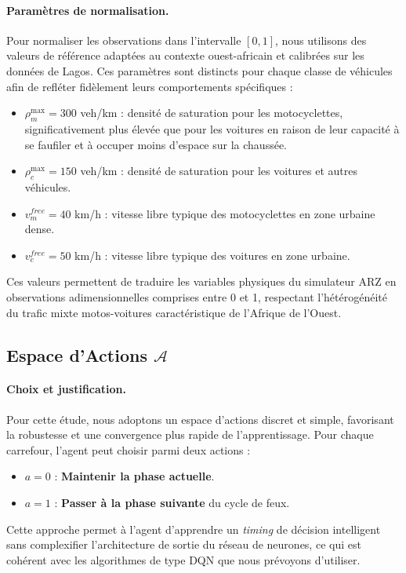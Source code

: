 \paragraph{Paramètres de normalisation.}
Pour normaliser les observations dans l'intervalle $[0, 1]$, nous utilisons des valeurs de référence adaptées au contexte ouest-africain et calibrées sur les données de Lagos. Ces paramètres sont distincts pour chaque classe de véhicules afin de refléter fidèlement leurs comportements spécifiques :

\begin{itemize}
    \item $\rho^{\max}_m = 300$ veh/km : densité de saturation pour les motocyclettes, significativement plus élevée que pour les voitures en raison de leur capacité à se faufiler et à occuper moins d'espace sur la chaussée.
    \item $\rho^{\max}_c = 150$ veh/km : densité de saturation pour les voitures et autres véhicules.
    \item $v^{free}_m = 40$ km/h : vitesse libre typique des motocyclettes en zone urbaine dense.
    \item $v^{free}_c = 50$ km/h : vitesse libre typique des voitures en zone urbaine.
\end{itemize}

Ces valeurs permettent de traduire les variables physiques du simulateur ARZ en observations adimensionnelles comprises entre 0 et 1, respectant l'hétérogénéité du trafic mixte motos-voitures caractéristique de l'Afrique de l'Ouest.

\subsection{Espace d'Actions $\mathcal{A}$}
\label{subsec:espace_actions}

\paragraph{Choix et justification.} Pour cette étude, nous adoptons un espace d'actions discret et simple, favorisant la robustesse et une convergence plus rapide de l'apprentissage. Pour chaque carrefour, l'agent peut choisir parmi deux actions :
\begin{itemize}
    \item $a=0$ : \textbf{Maintenir la phase actuelle}.
    \item $a=1$ : \textbf{Passer à la phase suivante} du cycle de feux.
\end{itemize}
Cette approche permet à l'agent d'apprendre un \textit{timing} de décision intelligent sans complexifier l'architecture de sortie du réseau de neurones, ce qui est cohérent avec les algorithmes de type DQN que nous prévoyons d'utiliser.

